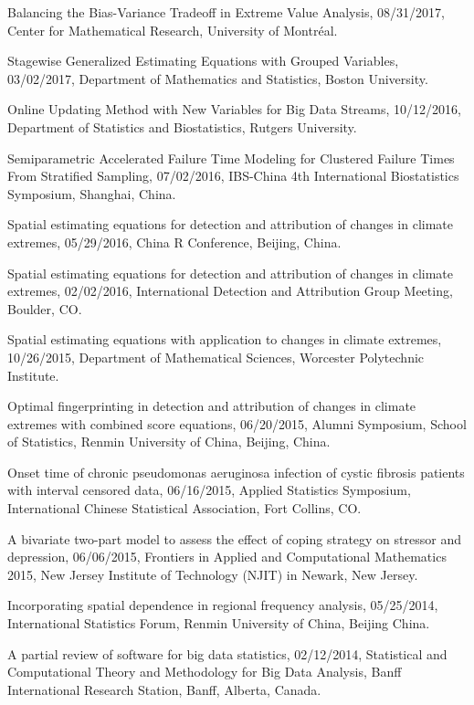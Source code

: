 \documentclass[Statistics]{vita}
\begin{document}
\begin{vita}
\begin{InvitedTalksLectures}
\begin{InvitedTalks}
  \item Balancing the Bias-Variance Tradeoff in Extreme Value Analysis, 08/31/2017, Center for Mathematical Research, University of Montr\'eal.
  \item Stagewise Generalized Estimating Equations with Grouped Variables, 03/02/2017, Department of Mathematics and Statistics, Boston University.
  \item Online Updating Method with New Variables for Big Data Streams, 10/12/2016, Department of Statistics and Biostatistics, Rutgers University.
  \item Semiparametric Accelerated Failure Time Modeling for Clustered Failure Times From Stratified Sampling, 07/02/2016, IBS-China 4th International Biostatistics Symposium, Shanghai, China.
  \item Spatial estimating equations for detection and attribution of changes in climate extremes, 05/29/2016, China R Conference, Beijing, China.
  \item Spatial estimating equations for detection and attribution of changes in climate extremes, 02/02/2016, International Detection and Attribution Group Meeting, Boulder, CO\@.
  \item Spatial estimating equations with application to changes in climate extremes, 10/26/2015, Department of Mathematical Sciences, Worcester Polytechnic Institute.
  \item Optimal fingerprinting in detection and attribution of changes in climate extremes with combined score equations, 06/20/2015, Alumni Symposium, School of Statistics, Renmin University of China, Beijing, China.
  \item Onset time of chronic pseudomonas aeruginosa infection of cystic fibrosis patients with interval censored data, 06/16/2015, Applied Statistics Symposium, International Chinese Statistical Association, Fort Collins, CO\@.
  \item A bivariate two-part model to assess the effect of coping strategy on stressor and depression, 06/06/2015, Frontiers in Applied and Computational Mathematics 2015, New Jersey Institute of Technology (NJIT) in Newark, New Jersey.
  \item Incorporating spatial dependence in regional frequency analysis, 05/25/2014, International Statistics Forum, Renmin University of China, Beijing China.
  \item A partial review of software for big data statistics, 02/12/2014, Statistical and Computational Theory and Methodology for Big Data Analysis, Banff International Research Station, Banff, Alberta, Canada.

\end{InvitedTalks}
\end{InvitedTalksLectures}
\end{vita}
\end{document}
